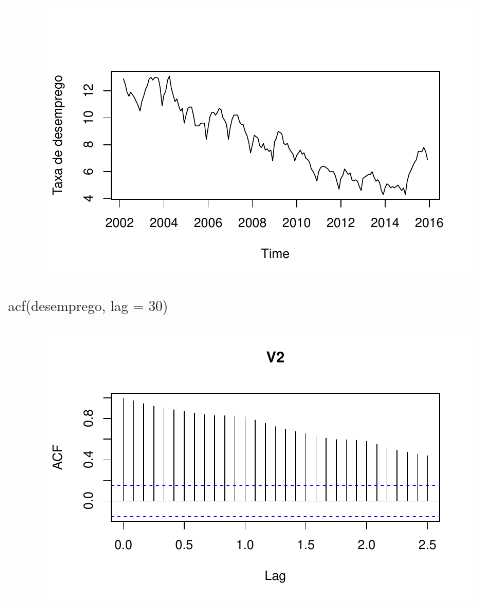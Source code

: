 \documentclass[
  letterpaper,
  DIV=11,
  numbers=noendperiod]{scrreprt}
\newenvironment{Shaded}{\begin{snugshade}}{\end{snugshade}}
\newcommand{\AttributeTok}[1]{\textcolor[rgb]{0.40,0.45,0.13}{#1}}
\newcommand{\DecValTok}[1]{\textcolor[rgb]{0.68,0.00,0.00}{#1}}
\newcommand{\FunctionTok}[1]{\textcolor[rgb]{0.28,0.35,0.67}{#1}}
\newcommand{\NormalTok}[1]{\textcolor[rgb]{0.00,0.23,0.31}{#1}}
\begin{document}
\begin{figure}[H]

{\centering \includegraphics{ferramentas_files/figure-pdf/unnamed-chunk-5-1.pdf}

}

\end{figure}

\begin{Shaded}
\begin{Highlighting}[]
\FunctionTok{acf}\NormalTok{(desemprego, }\AttributeTok{lag =} \DecValTok{30}\NormalTok{)}
\end{Highlighting}
\end{Shaded}

\begin{figure}[H]

{\centering \includegraphics{ferramentas_files/figure-pdf/unnamed-chunk-5-2.pdf}

}

\end{figure}
\end{document}
